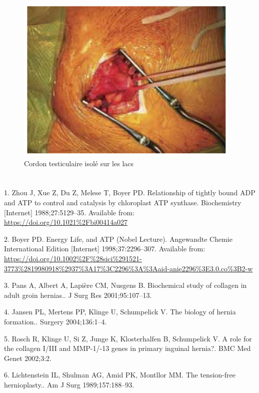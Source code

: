 \documentclass[frenc,10pt,a4paper]{article}
\begin{document}
\begin{figure}[b!]
\begin{center}
\includegraphics[width=0.70\columnwidth]{figures/Cordon_Testiculaire/Cordon_Testiculaire.png}
\caption{{Cordon testiculaire isolé sur les lacs
{\label{cordon_testiculaire}}%
}}
\end{center}
\end{figure}

\pagebreak

\clearpage
\section*{\refname}\sloppy
{}
\label{csl:1}1. Zhou J, Xue Z, Du Z, Melese T, Boyer PD. {Relationship of tightly bound {ADP} and {ATP} to control and catalysis by chloroplast {ATP} synthase}. Biochemistry [Internet] 1988;27:5129–35. Available from: \url{https://doi.org/10.1021\%2Fbi00414a027}

\label{csl:2}2. Boyer PD. {Energy Life, and {ATP} (Nobel Lecture)}. Angewandte Chemie International Edition [Internet] 1998;37:2296–307. Available from: \url{https://doi.org/10.1002\%2F\%28sici\%291521-3773\%2819980918\%2937\%3A17\%3C2296\%3A\%3Aaid-anie2296\%3E3.0.co\%3B2-w}

\label{csl:3}3. Pans A, Albert A, Lapière CM, Nusgens B. {Biochemical study of collagen in adult groin hernias.}. J Surg Res 2001;95:107–13. 

\label{csl:4}4. Jansen PL, Mertens PP, Klinge U, Schumpelick V. {The biology of hernia formation.}. Surgery 2004;136:1–4. 

\label{csl:5}5. Rosch R, Klinge U, Si Z, Junge K, Klosterhalfen B, Schumpelick V. {A role for the collagen I/III and MMP-1/-13 genes in primary inguinal hernia?}. BMC Med Genet 2002;3:2. 

\label{csl:6}6. Lichtenstein IL, Shulman AG, Amid PK, Montllor MM. {The tension-free hernioplasty.}. Am J Surg 1989;157:188–93. 
\end{document}
